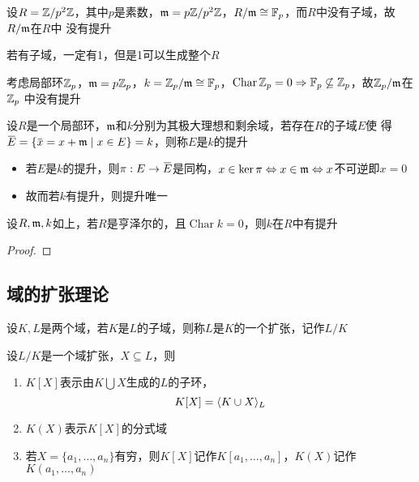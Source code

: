 \documentclass[11pt]{article}
\DeclareMathOperator{\Char}{Char}
\begin{document}
\begin{examplle}[]
设\(R=\mathbb{Z}/p^2\mathbb{Z}\)，其中\(p\)是素数，\(\mathfrak{m}=p\mathbb{Z}/p^2\mathbb{Z}\)，\(R/\mathfrak{m}\cong\mathbb{F}_p\)，而\(R\)中没有子域，故\(R/\mathfrak{m}\)在\(R\)中
没有提升

若有子域，一定有1，但是1可以生成整个\(R\)
\end{examplle}

\begin{examplle}[]
考虑局部环\(\mathbb{Z}_p\)，\(\mathfrak{m}=p\mathbb{Z}_p\)，\(k=\mathbb{Z}_p/\mathfrak{m}\cong\mathbb{F}_p\)，\(\Char\Z_p=0\Rightarrow\F_p\not\subseteq\Z_p\)，故\(\mathbb{Z}_p/\mathfrak{m}\)在\(\mathbb{Z}_p\)
中没有提升
\end{examplle}

\begin{definition}[]
设\(R\)是一个局部环，\(\mathfrak{m}\)和\(k\)分别为其极大理想和剩余域，若存在\(R\)的子域\(E\)使
得\(\barE=\{\barx=x+\fm\mid x\in E\}=k\)，则称\(E\)是\(k\)的提升
\end{definition}

\begin{remark}
\begin{itemize}
\item 若\(E\)是\(k\)的提升，则\(\pi:E\to\barE\)是同构，\(x\in\ker\pi\Leftrightarrow x\in\mathfrak{m}\Leftrightarrow x\)不可逆即\(x=0\)
\item 故而若\(k\)有提升，则提升唯一
\end{itemize}
\end{remark}

\begin{theorem}[提升定理]
设\(R,\mathfrak{m},k\)如上，若\(R\)是亨泽尔的，且\(\Char k=0\)，则\(k\)在\(R\)中有提升
\end{theorem}

\begin{proof}

\end{proof}
\subsection{域的扩张理论}
\label{sec:orgd2ba1fd}
\begin{definition}[]
设\(K,L\)是两个域，若\(K\)是\(L\)的子域，则称\(L\)是\(K\)的一个扩张，记作\(L/K\)
\end{definition}

\begin{definition}[]
设\(L/K\)是一个域扩张，\(X\subseteq L\)，则
\begin{enumerate}
\item \(K[X]\)表示由\(K\bigcup X\)生成的\(L\)的子环，
\begin{equation*}
K[X]=\langle K\cup X\rangle_L
\end{equation*}
\item \(K(X)\)表示\(K[X]\)的分式域
\item 若\(X=\{a_1,\dots,a_n\}\)有穷，则\(K[X]\)记作\(K[a_1,\dots,a_n]\)，\(K(X)\)记作\(K(a_1,\dots,a_n)\)
\end{enumerate}
\end{definition}
\end{document}
